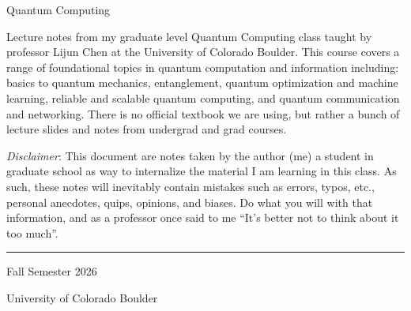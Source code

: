 \documentclass[11pt]{article}
\begin{document}

\begin{titlepage}
	\centering
	\vspace*{\fill}

	{\huge Quantum Computing \par}

	\vspace{20pt}


	\begin{center}
		\begin{minipage}{0.85\textwidth}
			Lecture notes from my graduate level Quantum Computing class taught by professor Lijun Chen at the University of Colorado Boulder. This course covers a range of foundational topics in quantum computation and information including: basics to quantum mechanics, entanglement, quantum optimization and machine learning, reliable and scalable quantum computing, and quantum communication and networking. There is no official textbook we are using, but rather a bunch of lecture slides and notes from undergrad and grad courses.

			\vspace{20pt}

			\textit{Disclaimer}: This document are notes taken by the author (me) a student in graduate school as way to internalize the material I am learning in this class. As such, these notes will inevitably contain mistakes such as errors, typos, etc., personal anecdotes, quips, opinions, and biases. Do what you will with that information, and as a professor once said to me ``It's better not to think about it too much''.
		\end{minipage}
	\end{center}

	\vspace*{\fill}

	\noindent\rule{10cm}{0.4pt}

	Fall Semester 2026

	University of Colorado Boulder

\end{titlepage}


\newpage
{}
\tableofcontents
\newpage


\raggedright
\end{document}
